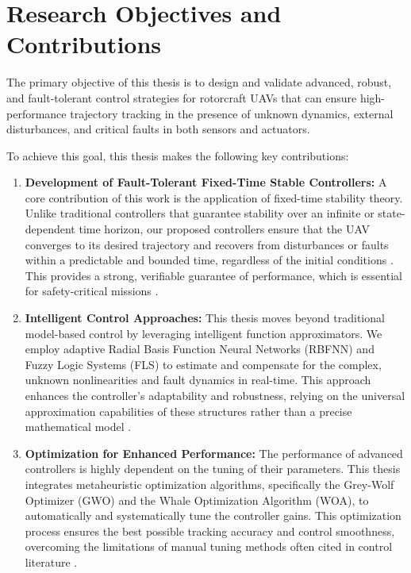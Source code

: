 \section{Research Objectives and Contributions}
\label{sec:intro_objectives}

The primary objective of this thesis is to design and validate advanced, robust, and fault-tolerant control strategies for rotorcraft UAVs that can ensure high-performance trajectory tracking in the presence of unknown dynamics, external disturbances, and critical faults in both sensors and actuators.

\noindent To achieve this goal, this thesis makes the following key contributions:

\begin{enumerate}
    \item \textbf{Development of Fault-Tolerant Fixed-Time Stable Controllers:} A core contribution of this work is the application of fixed-time stability theory. Unlike traditional controllers that guarantee stability over an infinite or state-dependent time horizon, our proposed controllers ensure that the UAV converges to its desired trajectory and recovers from disturbances or faults within a predictable and bounded time, regardless of the initial conditions \cite{Polyakov2012}. This provides a strong, verifiable guarantee of performance, which is essential for safety-critical missions \cite{Ni2016}.

    \item \textbf{Intelligent Control Approaches:} This thesis moves beyond traditional model-based control by leveraging intelligent function approximators. We employ adaptive Radial Basis Function Neural Networks (RBFNN) and Fuzzy Logic Systems (FLS) to estimate and compensate for the complex, unknown nonlinearities and fault dynamics in real-time. This  approach enhances the controller's adaptability and robustness, relying on the universal approximation capabilities of these structures rather than a precise mathematical model \cite{Park1991, Wang1994}.

    \item \textbf{Optimization for Enhanced Performance:} The performance of advanced controllers is highly dependent on the tuning of their parameters. This thesis integrates metaheuristic optimization algorithms, specifically the Grey-Wolf Optimizer (GWO) and the Whale Optimization Algorithm (WOA), to automatically and systematically tune the controller gains. This optimization process ensures the best possible tracking accuracy and control smoothness, overcoming the limitations of manual tuning methods often cited in control literature \cite{Precup2015, Eltogby2016, glida2019bat, glida2020pso, glida2021mffl}.
\end{enumerate}%
